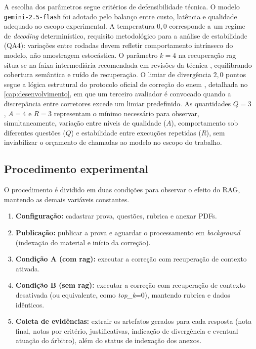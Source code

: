 A escolha dos parâmetros segue critérios de defensibilidade técnica. O modelo \texttt{gemini-2.5-flash} foi adotado pelo balanço entre custo, latência e qualidade adequado ao escopo experimental. A temperatura $0{,}0$ corresponde a um regime de \textit{decoding} determinístico, requisito metodológico para a análise de estabilidade (QA4): variações entre rodadas devem refletir comportamento intrínseco do modelo, não amostragem estocástica. O parâmetro $k=4$ na recuperação \gls{rag} situa-se na faixa intermediária recomendada em revisões da técnica \cite{finardi_chronicles_2024}, equilibrando cobertura semântica e ruído de recuperação. O limiar de divergência $2{,}0$ pontos segue a lógica estrutural do protocolo oficial de correção do \gls{enem} \cite{inep_cartilha_redacao_2024}, detalhada no \autoref{cap:desenvolvimento}, em que um terceiro avaliador é convocado quando a discrepância entre corretores excede um limiar predefinido. As quantidades $Q=3$, $A=4$ e $R=3$ representam o mínimo necessário para observar, simultaneamente, variação entre níveis de qualidade ($A$), comportamento sob diferentes questões ($Q$) e estabilidade entre execuções repetidas ($R$), sem inviabilizar o orçamento de chamadas ao modelo no escopo do trabalho.

\subsection{Procedimento experimental}
O procedimento é dividido em duas condições para observar o efeito do RAG, mantendo as demais variáveis constantes.

\begin{enumerate}
    \item \textbf{Configuração:} cadastrar prova, questões, rubrica e anexar PDFs.
    \item \textbf{Publicação:} publicar a prova e aguardar o processamento em \textit{background} (indexação do material e início da correção).
    \item \textbf{Condição A (com \gls{rag}):} executar a correção com recuperação de contexto ativada.
    \item \textbf{Condição B (sem \gls{rag}):} executar a correção com recuperação de contexto desativada (ou equivalente, como \textit{top\_k}=0), mantendo rubrica e dados idênticos.
    \item \textbf{Coleta de evidências:} extrair os artefatos gerados para cada resposta (nota final, notas por critério, justificativas, indicação de divergência e eventual atuação do árbitro), além do status de indexação dos anexos.
\end{enumerate}

